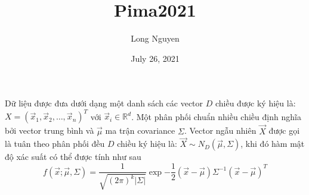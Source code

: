 \documentclass{article}
\title{Pima2021}
\author{Long Nguyen}
\date{July 26, 2021}
\begin{document}
\maketitle
Dữ liệu được đưa dưới dạng một danh sách các vector $D$ chiều được ký hiệu là: $X = (\vec{x}_1, \vec{x}_2, \ldots, \vec{x}_n)^T$ với $\vec{x}_i \in \mathbb{R}^d$. Một phân phối chuẩn nhiều chiều định nghĩa bởi vector trung bình và $\vec{\mu}$ ma trận covariance $\Sigma$. Vector ngẫu nhiên $\vec{X}$  được gọi là tuân theo phân phối đều $D$ chiều ký hiệu là: $\vec{X} \sim N_D(\vec{\mu}, \Sigma)$, khi đó hàm mật độ xác suất có thể được tính như sau
$$
    f(\vec{x}; \vec{\mu}, \Sigma)
    = \dfrac{1}{\sqrt{(2\pi)^k|\Sigma|}} \exp{-\dfrac{1}{2} (\vec{x} - \vec{\mu}) \Sigma^{-1} (\vec{x}-\vec{\mu})^T}
$$
\end{document}
